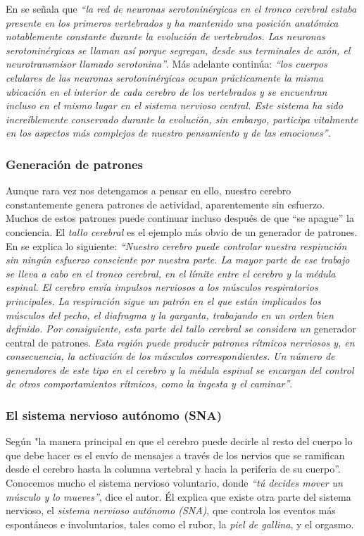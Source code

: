 En \cite{JohnAllman2000} se señala que {\it ``la red de neuronas serotoninérgicas en el tronco cerebral estaba presente en los primeros vertebrados y ha mantenido una posición anatómica notablemente constante durante la evolución de vertebrados. Las neuronas serotoninérgicas se llaman así porque segregan, desde sus terminales de axón, el neurotransmisor llamado serotonina''}. Más adelante continúa: {\it ``los cuerpos celulares de las neuronas serotoninérgicas ocupan prácticamente la misma ubicación en el interior de cada cerebro de los vertebrados y se encuentran incluso en el mismo lugar en el sistema nervioso central. Este sistema ha sido increíblemente conservado durante la evolución, sin embargo, participa vitalmente en los aspectos más complejos de nuestro pensamiento y de las emociones''}. 

\subsubsection{Generación de patrones}

Aunque rara vez nos detengamos a pensar en ello, nuestro cerebro constantemente genera patrones de actividad, aparentemente sin esfuerzo. Muchos de estos patrones puede continuar incluso después de que ``se apague'' la conciencia. El {\it tallo cerebral} es el ejemplo más obvio de un generador de patrones. En \cite{Shubin2009} se explica lo siguiente: {\it ``Nuestro cerebro puede controlar nuestra respiración sin ningún esfuerzo consciente por nuestra parte. La mayor parte de ese trabajo se lleva a cabo en el tronco cerebral, en el límite entre el cerebro y la médula espinal. El cerebro envía impulsos nerviosos a los músculos respiratorios principales. La respiración sigue un patrón en el que están implicados los músculos del pecho, el diafragma y la garganta, trabajando en un orden bien definido. Por consiguiente, esta parte del tallo cerebral se considera un }generador central de patrones. {\it Esta región puede producir patrones rítmicos nerviosos y, en consecuencia, la activación de los músculos correspondientes. Un número de generadores de este tipo en el cerebro y la médula espinal se encargan del control de otros comportamientos rítmicos, como la ingesta y el caminar''}.

\subsubsection{El sistema nervioso autónomo (SNA)}

Según \cite{Sapolsky2004} "la manera principal en que el cerebro puede decirle al resto del cuerpo lo que debe hacer es el envío de mensajes a través de los nervios que se ramifican desde el cerebro hasta la columna vertebral y hacia la periferia de su cuerpo''. Conocemos mucho el sistema nervioso voluntario, donde {\it ``tú decides mover un músculo y lo mueves''}, dice el autor. Él explica que existe otra parte del sistema nervioso, el {\it sistema nervioso autónomo (\acs{SNA})}, que controla los eventos más espontáneos e involuntarios, tales como el rubor, la {\it piel de gallina}, y el orgasmo.

